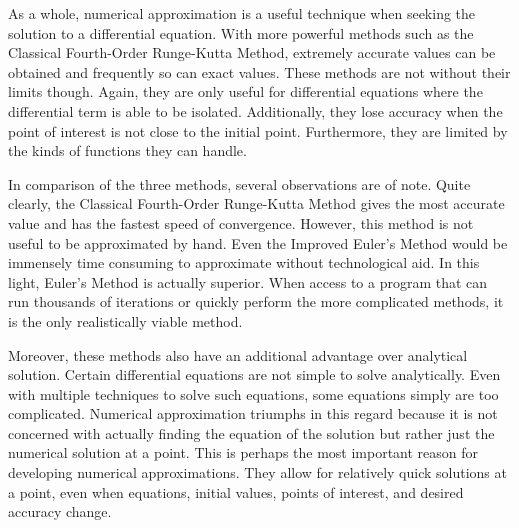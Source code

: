 \documentclass[12pt, letterpaper]{report}
\begin{document}
As a whole, numerical approximation is a useful technique when seeking the solution to a differential equation. With more powerful methods such as the Classical Fourth-Order Runge-Kutta Method, extremely accurate values can be obtained and frequently so can exact values. These methods are not without their limits though. Again, they are only useful for differential equations where the differential term is able to be isolated. Additionally, they lose accuracy when the point of interest is not close to the initial point. Furthermore, they are limited by the kinds of functions they can handle.

In comparison of the three methods, several observations are of note. Quite clearly, the Classical Fourth-Order Runge-Kutta Method gives the most accurate value and has the fastest speed of convergence. However, this method is not useful to be approximated by hand. Even the Improved Euler's Method would be immensely time consuming to approximate without technological aid. In this light, Euler's Method is actually superior. When access to a program that can run thousands of iterations or quickly perform the more complicated methods, it is the only realistically viable method.

Moreover, these methods also have an additional advantage over analytical solution. Certain differential equations are not simple to solve analytically. Even with multiple techniques to solve such equations, some equations simply are too complicated. Numerical approximation triumphs in this regard because it is not concerned with actually finding the equation of the  solution but rather just the numerical solution at a point. This is perhaps the most important reason for developing numerical approximations. They allow for relatively quick solutions at a point, even when equations, initial values, points of interest, and desired accuracy change.
\end{document}
